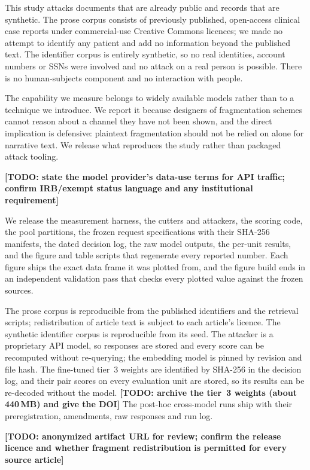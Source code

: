\documentclass[sigconf,review]{acmart}
\newcommand{\TODO}[1]{\textbf{[TODO: #1]}}
\begin{document}
\begin{ethics}
This study attacks documents that are already public and records that are
synthetic. The prose corpus consists of previously published, open-access
clinical case reports under commercial-use Creative Commons licences; we made
no attempt to identify any patient and add no information beyond the published
text. The identifier corpus is entirely synthetic, so no real identities,
account numbers or SSNs were involved and no attack on a real person is
possible. There is no human-subjects component and no interaction with people.

The capability we measure belongs to widely available models rather than to a
technique we introduce. We report it because designers of fragmentation schemes
cannot reason about a channel they have not been shown, and the direct
implication is defensive: plaintext fragmentation should not be relied on alone
for narrative text. We release what reproduces the study rather than packaged
attack tooling.

\TODO{state the model provider's data-use terms for API traffic; confirm
IRB/exempt status language and any institutional requirement}
\end{ethics}

\begin{openscience}
We release the measurement harness, the cutters and attackers, the scoring
code, the pool partitions, the frozen request specifications with their SHA-256
manifests, the dated decision log, the raw model outputs, the per-unit results,
and the figure and table scripts that regenerate every reported number. Each
figure ships the exact data frame it was plotted from, and the figure build
ends in an independent validation pass that checks every plotted value against
the frozen sources.

The prose corpus is reproducible from the published identifiers and the
retrieval scripts; redistribution of article text is subject to each article's
licence. The synthetic identifier corpus is reproducible from its seed. The
attacker is a proprietary API model, so responses are stored and every score
can be recomputed without re-querying; the embedding model is pinned by
revision and file hash. The fine-tuned tier~3 weights are identified by
SHA-256 in the decision log, and their pair scores on every evaluation unit are
stored, so its results can be re-decoded without the model.
\TODO{archive the tier~3 weights (about 440\,MB) and give the DOI} The
post-hoc cross-model runs ship with their preregistration, amendments, raw
responses and run log.

\TODO{anonymized artifact URL for review; confirm the release licence and
whether fragment redistribution is permitted for every source article}
\end{openscience}
\end{document}
